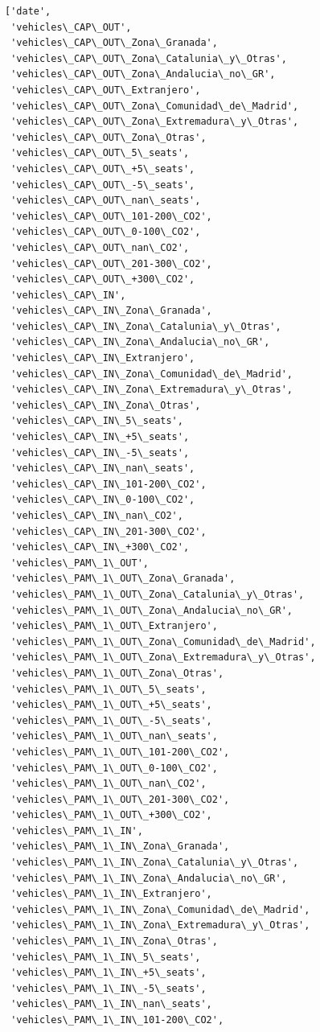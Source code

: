 \documentclass[11pt]{article}
\begin{document}
    \begin{Verbatim}[commandchars=\\\{\}]
['date',
 'vehicles\_CAP\_OUT',
 'vehicles\_CAP\_OUT\_Zona\_Granada',
 'vehicles\_CAP\_OUT\_Zona\_Catalunia\_y\_Otras',
 'vehicles\_CAP\_OUT\_Zona\_Andalucia\_no\_GR',
 'vehicles\_CAP\_OUT\_Extranjero',
 'vehicles\_CAP\_OUT\_Zona\_Comunidad\_de\_Madrid',
 'vehicles\_CAP\_OUT\_Zona\_Extremadura\_y\_Otras',
 'vehicles\_CAP\_OUT\_Zona\_Otras',
 'vehicles\_CAP\_OUT\_5\_seats',
 'vehicles\_CAP\_OUT\_+5\_seats',
 'vehicles\_CAP\_OUT\_-5\_seats',
 'vehicles\_CAP\_OUT\_nan\_seats',
 'vehicles\_CAP\_OUT\_101-200\_CO2',
 'vehicles\_CAP\_OUT\_0-100\_CO2',
 'vehicles\_CAP\_OUT\_nan\_CO2',
 'vehicles\_CAP\_OUT\_201-300\_CO2',
 'vehicles\_CAP\_OUT\_+300\_CO2',
 'vehicles\_CAP\_IN',
 'vehicles\_CAP\_IN\_Zona\_Granada',
 'vehicles\_CAP\_IN\_Zona\_Catalunia\_y\_Otras',
 'vehicles\_CAP\_IN\_Zona\_Andalucia\_no\_GR',
 'vehicles\_CAP\_IN\_Extranjero',
 'vehicles\_CAP\_IN\_Zona\_Comunidad\_de\_Madrid',
 'vehicles\_CAP\_IN\_Zona\_Extremadura\_y\_Otras',
 'vehicles\_CAP\_IN\_Zona\_Otras',
 'vehicles\_CAP\_IN\_5\_seats',
 'vehicles\_CAP\_IN\_+5\_seats',
 'vehicles\_CAP\_IN\_-5\_seats',
 'vehicles\_CAP\_IN\_nan\_seats',
 'vehicles\_CAP\_IN\_101-200\_CO2',
 'vehicles\_CAP\_IN\_0-100\_CO2',
 'vehicles\_CAP\_IN\_nan\_CO2',
 'vehicles\_CAP\_IN\_201-300\_CO2',
 'vehicles\_CAP\_IN\_+300\_CO2',
 'vehicles\_PAM\_1\_OUT',
 'vehicles\_PAM\_1\_OUT\_Zona\_Granada',
 'vehicles\_PAM\_1\_OUT\_Zona\_Catalunia\_y\_Otras',
 'vehicles\_PAM\_1\_OUT\_Zona\_Andalucia\_no\_GR',
 'vehicles\_PAM\_1\_OUT\_Extranjero',
 'vehicles\_PAM\_1\_OUT\_Zona\_Comunidad\_de\_Madrid',
 'vehicles\_PAM\_1\_OUT\_Zona\_Extremadura\_y\_Otras',
 'vehicles\_PAM\_1\_OUT\_Zona\_Otras',
 'vehicles\_PAM\_1\_OUT\_5\_seats',
 'vehicles\_PAM\_1\_OUT\_+5\_seats',
 'vehicles\_PAM\_1\_OUT\_-5\_seats',
 'vehicles\_PAM\_1\_OUT\_nan\_seats',
 'vehicles\_PAM\_1\_OUT\_101-200\_CO2',
 'vehicles\_PAM\_1\_OUT\_0-100\_CO2',
 'vehicles\_PAM\_1\_OUT\_nan\_CO2',
 'vehicles\_PAM\_1\_OUT\_201-300\_CO2',
 'vehicles\_PAM\_1\_OUT\_+300\_CO2',
 'vehicles\_PAM\_1\_IN',
 'vehicles\_PAM\_1\_IN\_Zona\_Granada',
 'vehicles\_PAM\_1\_IN\_Zona\_Catalunia\_y\_Otras',
 'vehicles\_PAM\_1\_IN\_Zona\_Andalucia\_no\_GR',
 'vehicles\_PAM\_1\_IN\_Extranjero',
 'vehicles\_PAM\_1\_IN\_Zona\_Comunidad\_de\_Madrid',
 'vehicles\_PAM\_1\_IN\_Zona\_Extremadura\_y\_Otras',
 'vehicles\_PAM\_1\_IN\_Zona\_Otras',
 'vehicles\_PAM\_1\_IN\_5\_seats',
 'vehicles\_PAM\_1\_IN\_+5\_seats',
 'vehicles\_PAM\_1\_IN\_-5\_seats',
 'vehicles\_PAM\_1\_IN\_nan\_seats',
 'vehicles\_PAM\_1\_IN\_101-200\_CO2',

\end{Verbatim}
\end{document}

